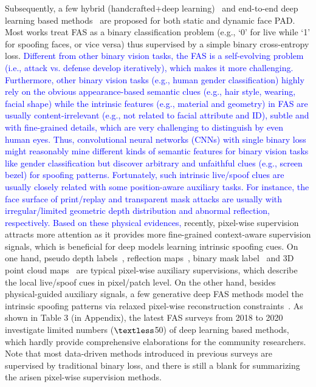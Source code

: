\documentclass[10pt,journal,compsoc]{IEEEtran}
\begin{document}
Subsequently, a few hybrid (handcrafted+deep learning)~\cite{song2019discriminative,asim2017cnn,rehman2020enhancing,khammari2019robust} and end-to-end deep learning based methods~\cite{yu2020searching,yu2020face,Liu2018Learning,yang2019face,Atoum2018Face,yu2020multi,zhang2020casia} are proposed for both static and dynamic face PAD. Most works\cite{yang2014learn,Li2017An,Patel2016Cross,george2019deep,jourabloo2018face,jia20203d,li2020compactnet} treat FAS as a binary classification problem (e.g., `0' for live while `1' for spoofing faces, or vice versa) thus supervised by a simple binary cross-entropy loss. \textcolor{blue}{Different from other binary vision tasks, the FAS is a self-evolving problem (i.e., attack vs. defense develop iteratively), which makes it more challenging. Furthermore, other binary vision tasks (e.g., human gender classification) highly rely on the obvious appearance-based semantic clues (e.g., hair style, wearing, facial shape) while the intrinsic features (e.g., material and geometry) in FAS are usually content-irrelevant (e.g., not related to facial attribute and ID), subtle and with fine-grained details, which are very challenging to distinguish by even human eyes. Thus, convolutional neural networks (CNNs) with single binary loss might reasonably mine different kinds of semantic features for binary vision tasks like gender classification but discover arbitrary and unfaithful clues (e.g., screen bezel) for spoofing patterns. Fortunately, such intrinsic live/spoof clues are usually closely related with some position-aware auxiliary tasks. For instance, the face surface of print/replay and transparent mask attacks are usually with irregular/limited geometric depth distribution and abnormal reflection, respectively. Based on these physical evidences,} recently, pixel-wise supervision~\cite{Atoum2018Face,Liu2018Learning,yu2020face,kim2019basn,george2019deep,yu2020fas2} attracts more attention as it provides more fine-grained context-aware supervision signals, which is beneficial for deep models learning intrinsic spoofing cues. On one hand, pseudo depth labels~\cite{Atoum2018Face,Liu2018Learning}, reflection maps~\cite{yu2020face,kim2019basn}, binary mask label~\cite{george2019deep,liu2019deep,sun2020face} and 3D point cloud maps~\cite{li3dpc} are typical pixel-wise auxiliary supervisions, which describe the local live/spoof cues in pixel/patch level. On the other hand, besides physical-guided auxiliary signals, a few generative deep FAS methods model the intrinsic spoofing patterns via relaxed pixel-wise reconstruction constraints~\cite{jourabloo2018face,feng2020learning,liu2020physics,qin2021meta}. As shown in Table 3 (in Appendix), the latest FAS surveys from 2018 to 2020 investigate limited numbers ($\textless$50) of deep learning based methods, which hardly provide comprehensive elaborations for the community researchers. Note that most data-driven methods introduced in previous surveys are supervised by traditional binary loss, and there is still a blank for summarizing the arisen pixel-wise supervision methods. 
\end{document}
